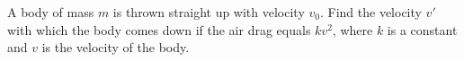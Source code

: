 \item A body of mass \( m \) is thrown straight up with velocity \( v_0 \). Find the velocity \( v' \) with which the body comes down if the air drag equals \( kv^2 \), where \( k \) is a constant and \( v \) is the velocity of the body.